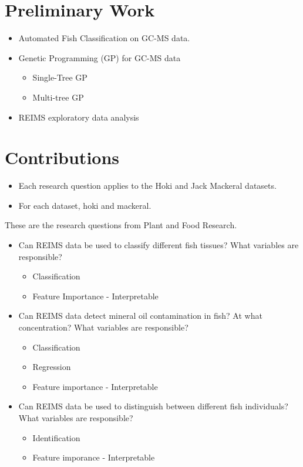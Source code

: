 \documentclass{article}
\begin{document}
\section{Preliminary Work}
\label{sec:preliminary}

\begin{itemize}
  \item Automated Fish Classification on GC-MS data. 
  \item Genetic Programming (GP) for GC-MS data 
  \begin{itemize}
    \item Single-Tree GP 
    \item Multi-tree GP 
  \end{itemize}
  \item REIMS exploratory data analysis 
\end{itemize}

\section{Contributions}
\label{sec:contributions}

\begin{itemize}
  \item Each research question applies to the Hoki and Jack Mackeral datasets. 
  \item For each dataset, hoki and mackeral. 
\end{itemize}

These are the research questions from Plant and Food Research. 

\begin{itemize}
  \item Can REIMS data be used to classify different fish tissues? What variables are responsible?
  \begin{itemize}
    \item Classification 
    \item Feature Importance - Interpretable 
  \end{itemize}
  \item Can REIMS data detect mineral oil contamination in fish? At what concentration? What variables are responsible?
  \begin{itemize}
    \item Classification 
    \item Regression 
    \item Feature importance - Interpretable 
  \end{itemize}
  \item Can REIMS data be used to distinguish between different fish individuals? What variables are responsible?
  \begin{itemize}
    \item Identification 
    \item Feature imporance - Interpretable 
  \end{itemize}
\end{itemize}
\end{document}
